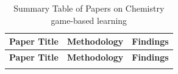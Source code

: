 
\begin{longtable}{|p{}|p{}|p{}|}
\hline
\textbf{Paper Title} & \textbf{Methodology} & \textbf{Findings} \\
\hline
\endfirsthead

\hline
\textbf{Paper Title} & \textbf{Methodology} & \textbf{Findings} \\
\hline
\endhead

\hline
\endfoot


\caption{Summary Table of Papers on Chemistry game-based learning}
\label{tab:chemistry_gbl}
\end{longtable}

